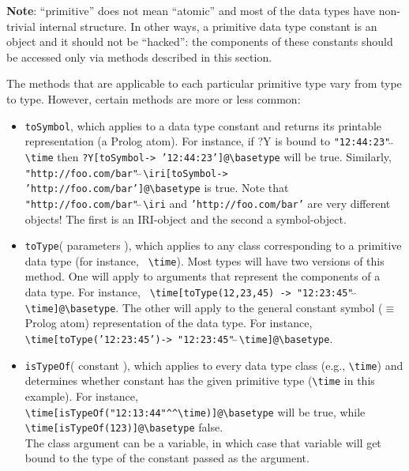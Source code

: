 \documentclass[11pt]{article}
\newcommand{\bs}{\textbackslash}
\begin{document}
\textbf{Note}: ``primitive'' does not mean ``atomic'' and most of the data
types have non-trivial internal structure. In other ways, a primitive data
type constant is an object and it should not be ``hacked'': 
the components of these constants should be accessed only via methods
described in this section.

The methods that are applicable to each particular primitive type vary from
type to type. However, certain methods are more or less common:

 \begin{itemize}
    \item {\tt toSymbol}, which applies to a data type constant and
      returns its printable representation (a Prolog atom). For instance, if ?Y is bound to
      {\tt "12:44:23"$\hat{~}\hat{~}$\bs{}time} then
      {\tt ?Y[toSymbol-> '12:44:23']@\bs{}basetype} will
      be true.
      Similarly,
      \texttt{"http://foo.com/bar"$\hat{~}\hat{~}$\bs{}iri[toSymbol-> 'http://foo.com/bar']@\bs{}basetype}
      is true. Note that
      \texttt{"http://foo.com/bar"$\hat{~}\hat{~}$\bs{}iri} and
      \texttt{'http://foo.com/bar'} are very different objects! The first
      is an IRI-object and the second a symbol-object. 
    \item {\tt toType}( parameters ), which applies to any class
      corresponding to a primitive data type (for instance, {\tt
        \bs{}time}). Most types will have two versions of this method. One
      will apply to arguments that represent the components of a data
      type. For instance, {\tt
        \bs{}time[toType(12,23,45) ->
        "12:23:45"$\hat{~}\hat{~}$\bs{}time]@\bs{}basetype}.  The other will
      apply to the general constant symbol ($\equiv$ Prolog atom)
      representation of the data type. For instance,
      {\tt
        \bs{}time[toType('12:23:45')-> "12:23:45"$\hat{~}\hat{~}$\bs{}time]@\bs{}basetype}. 
    \item {\tt isTypeOf}( constant ), which applies to every data type
      class (e.g., {\tt \bs{}time}) and determines whether constant has the
      given primitive type ({\tt \bs{}time} in this example).
      For instance,
      \\
      \verb|\time[isTypeOf("12:13:44"^^\time)]@\basetype| will be true, while
      \\
      \verb|\time[isTypeOf(123)]@\basetype| false.
      \\
      The class argument can be a variable, in which case that variable
      will get bound to the type of the constant passed as the argument.

\end{itemize}
\end{document}
